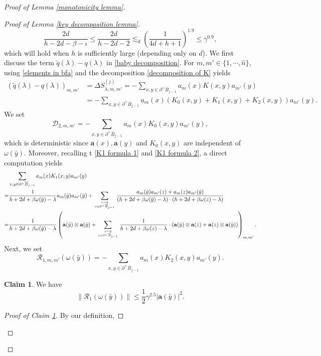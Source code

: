 \documentclass[11pt,reqno,UTF8,twoside]{amsart}
\newcommand{\tq}{\tilde{q}}
\newcommand{\bfa}{\mathbf{a}}
\newcommand{\mcD}{\mathcal{D}}
\newcommand{\mcR}{\mathcal{R}}
\newcommand{\whn}{\widehat{n}}
\newcommand{\barB}{\overline{B}}
\newcommand{\diffSj}{\Delta {S}^{(j)}}
\theoremstyle{definition}
\newtheorem{claim}[thm]{\bf Claim}
\numberwithin{equation}{section}
\begin{document}
\begin{proof}[Proof of Lemma \ref{monotonicity lemma}]
\begin{proof}[Proof of Lemma \ref{key decomposition lemma}]
\begin{equation}
   \frac{2d}{h-2d-\beta-\iota}\leq \frac{2d}{h-2d-2}\lesssim_d   \left(\frac{1}{4d+h+1}\right) ^{1.9} \leq  \gamma^{0.9},
\end{equation}
which will hold when $h$ is sufficiently large (depending only on $d$). 
We first discuss the term $\tq(\lambda)-q(\lambda)$ in \eqref{baby decomposition}. For $m,m'\in \{1,\cdots,\whn \}$, using \eqref{elements in bfa} and the decomposition \eqref{decomposition of K} yields 
\begin{align*}
  (\tq(\lambda)-q(\lambda))_{m,m'} & = \diffSj_{\lambda,m,m'}= -\sum_{x,y\in \partial^+ \barB_{j-1}}a_{m}(x) K(x,y) a_{m'}(y)\\
    &=-\sum_{x,y\in \partial^+ \barB_{j-1}}a_{m}(x)\left(K_0(x,y) +K_1(x,y)+K_2(x,y) \right)a_{m'}(y).
\end{align*}
We set 
\begin{equation}\label{mcD2}
  \mcD_{2,m,m'}=-\sum_{x,y\in \partial^+ \barB_{j-1}}a_{m}(x)K_0(x,y)a_{m'}(y),
\end{equation}
which is deterministic since $\bfa(x),\bfa(y)$ and $K_0(x,y)$ are independent of $\omega(\bar{y})$.
Moreover, recalling t \eqref{K1 formula 1} and \eqref{K1 formula 2}, a direct computation yields 
{\small
\begin{align*}
  &\sum_{x,y\in \partial^+ \barB_{j-1}}a_{m}(x)K_1(x,y)a_{m'}(y) \\
  =& \frac{1}{h+2d+\beta\omega(\bar{y})-\lambda}a_{m}(\bar{y}) a_{m'}(\bar{y}) + \sum_{z\sim \bar{y} \atop z\in \partial^+\barB_{j-1}} \frac{a_m(\bar{y})a_{m'}(z)+a_m(z)a_{m'}(\bar{y})}{(h+2d+\beta\omega(\bar{y})-\lambda)\cdot (h+2d+\beta\omega(z)-\lambda)} \\
  =&\frac{1}{h+2d+\beta \omega(\bar{y})-\lambda}\left(\bfa(\bar{y})\otimes \bfa(\bar{y})+ \sum_{z\sim \bar{y} \atop z\in \partial^+\barB_{j-1}} \frac{1}{h+2d+\beta\omega(z)-\lambda } \cdot(\bfa(\bar{y}) \otimes  \bfa(z)+\bfa(z)\otimes\bfa(\bar{y})  )\right)_{m,m'}.
\end{align*}
}
Next, we set
\begin{equation}\label{mcR1}
  \mcR_{1,m,m'}(\omega(\bar{y}))=-\sum_{x,y\in \partial^+ \barB_{j-1}}a_{m}(x)K_2(x,y)a_{m'}(y).
\end{equation}
\begin{claim}\label{estimate on mcR1}
  We have 
  \[\|\mcR_{1}(\omega(\bar{y}))\| \leq \frac{1}{2}\gamma^{2.5} |\bfa(\bar{y})|^2. \]
\end{claim}
\begin{proof}[Proof of Claim \ref{estimate on mcR1}]
  By our definition,

\end{proof}
\end{proof}
\end{proof}
\end{document}
